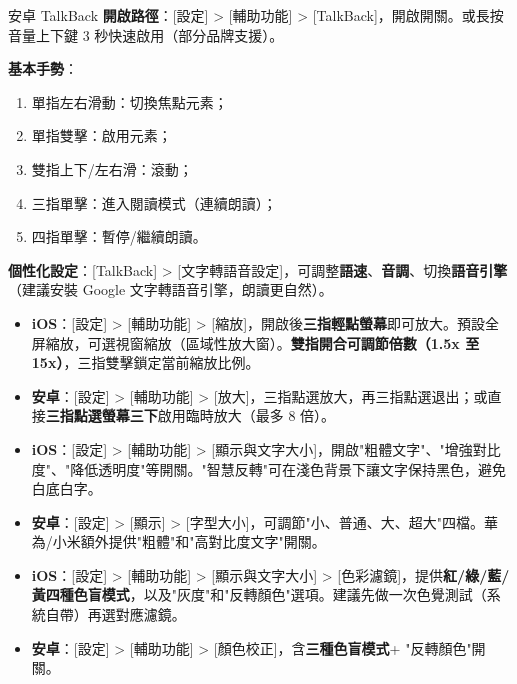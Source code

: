 \begin{tcbinfo}{安卓 TalkBack}
\textbf{開啟路徑}：[設定] > [輔助功能] > [TalkBack]，開啟開關。或長按音量上下鍵 3 秒快速啟用（部分品牌支援）。

\textbf{基本手勢}：

\begin{enumerate}
  \item 單指左右滑動：切換焦點元素；
  \item 單指雙擊：啟用元素；
  \item 雙指上下/左右滑：滾動；
  \item 三指單擊：進入閱讀模式（連續朗讀）；
  \item 四指單擊：暫停/繼續朗讀。
\end{enumerate}

\textbf{個性化設定}：[TalkBack] > [文字轉語音設定]，可調整\textbf{語速}、\textbf{音調}、切換\textbf{語音引擎}（建議安裝 Google 文字轉語音引擎，朗讀更自然）。

\end{tcbinfo}



\begin{itemize}
  \item \textbf{iOS}：[設定] > [輔助功能] > [縮放]，開啟後\textbf{三指輕點螢幕}即可放大。預設全屏縮放，可選視窗縮放（區域性放大窗）。\textbf{雙指開合可調節倍數（1.5x 至 15x）}，三指雙擊鎖定當前縮放比例。
  \item \textbf{安卓}：[設定] > [輔助功能] > [放大]，三指點選放大，再三指點選退出；或直接\textbf{三指點選螢幕三下}啟用臨時放大（最多 8 倍）。
\end{itemize}


\begin{itemize}
  \item \textbf{iOS}：[設定] > [輔助功能] > [顯示與文字大小]，開啟"粗體文字"、"增強對比度"、"降低透明度"等開關。"智慧反轉"可在淺色背景下讓文字保持黑色，避免白底白字。
  \item \textbf{安卓}：[設定] > [顯示] > [字型大小]，可調節"小、普通、大、超大"四檔。華為/小米額外提供"粗體"和"高對比度文字"開關。
\end{itemize}


\begin{itemize}
  \item \textbf{iOS}：[設定] > [輔助功能] > [顯示與文字大小] > [色彩濾鏡]，提供\textbf{紅/綠/藍/黃四種色盲模式}，以及"灰度"和"反轉顏色"選項。建議先做一次色覺測試（系統自帶）再選對應濾鏡。
  \item \textbf{安卓}：[設定] > [輔助功能] > [顏色校正]，含\textbf{三種色盲模式}+ "反轉顏色"開關。
\end{itemize}

